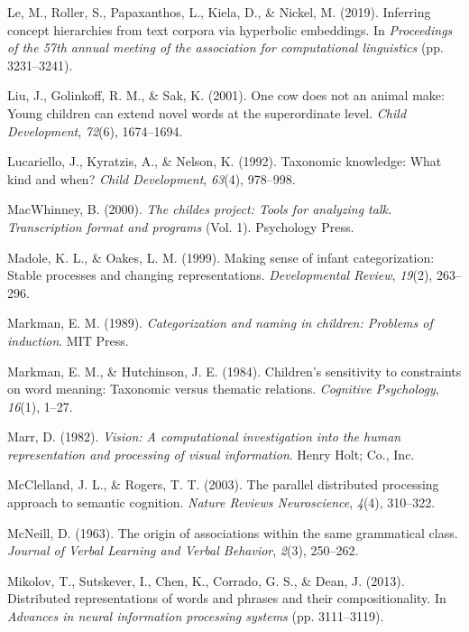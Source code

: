 \documentclass[english,,man]{apa6}
\begin{document}
\leavevmode\hypertarget{ref-le2019inferring}{}%
Le, M., Roller, S., Papaxanthos, L., Kiela, D., \& Nickel, M. (2019). Inferring concept hierarchies from text corpora via hyperbolic embeddings. In \emph{Proceedings of the 57th annual meeting of the association for computational linguistics} (pp. 3231--3241).

\leavevmode\hypertarget{ref-liu2001}{}%
Liu, J., Golinkoff, R. M., \& Sak, K. (2001). One cow does not an animal make: Young children can extend novel words at the superordinate level. \emph{Child Development}, \emph{72}(6), 1674--1694.

\leavevmode\hypertarget{ref-lucariello1992taxonomic}{}%
Lucariello, J., Kyratzis, A., \& Nelson, K. (1992). Taxonomic knowledge: What kind and when? \emph{Child Development}, \emph{63}(4), 978--998.

\leavevmode\hypertarget{ref-macwhinney2000}{}%
MacWhinney, B. (2000). \emph{The childes project: Tools for analyzing talk. Transcription format and programs} (Vol. 1). Psychology Press.

\leavevmode\hypertarget{ref-madole1999}{}%
Madole, K. L., \& Oakes, L. M. (1999). Making sense of infant categorization: Stable processes and changing representations. \emph{Developmental Review}, \emph{19}(2), 263--296.

\leavevmode\hypertarget{ref-markman1989}{}%
Markman, E. M. (1989). \emph{Categorization and naming in children: Problems of induction}. MIT Press.

\leavevmode\hypertarget{ref-markman1984children}{}%
Markman, E. M., \& Hutchinson, J. E. (1984). Children's sensitivity to constraints on word meaning: Taxonomic versus thematic relations. \emph{Cognitive Psychology}, \emph{16}(1), 1--27.

\leavevmode\hypertarget{ref-marr1982}{}%
Marr, D. (1982). \emph{Vision: A computational investigation into the human representation and processing of visual information}. Henry Holt; Co., Inc.

\leavevmode\hypertarget{ref-mcclelland2003}{}%
McClelland, J. L., \& Rogers, T. T. (2003). The parallel distributed processing approach to semantic cognition. \emph{Nature Reviews Neuroscience}, \emph{4}(4), 310--322.

\leavevmode\hypertarget{ref-mcneill1963origin}{}%
McNeill, D. (1963). The origin of associations within the same grammatical class. \emph{Journal of Verbal Learning and Verbal Behavior}, \emph{2}(3), 250--262.

\leavevmode\hypertarget{ref-mikolov2013}{}%
Mikolov, T., Sutskever, I., Chen, K., Corrado, G. S., \& Dean, J. (2013). Distributed representations of words and phrases and their compositionality. In \emph{Advances in neural information processing systems} (pp. 3111--3119).
\end{document}
